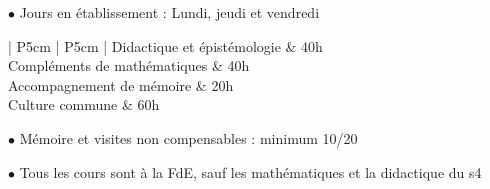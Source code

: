 \documentclass[oneside,12pt]{article}
\begin{document}
$\bullet$ Jours en établissement : Lundi, jeudi et vendredi

\renewcommand{\arraystretch}{1.5}
\begin{tabular}{| P{5cm} | P{5cm} |} \hline
	Didactique et épistémologie & 40h \\ \hline
	Compléments de mathématiques & 40h \\ \hline
	Accompagnement de mémoire & 20h \\ \hline
	Culture commune & 60h \\ \hline
\end{tabular}

$\bullet$ Mémoire et visites non compensables : minimum 10/20

$\bullet$ Tous les cours sont à la FdE, sauf les mathématiques et la didactique du s4
\end{document}
